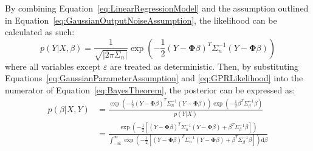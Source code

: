 \documentclass{article}
\begin{document}
By combining Equation~\eqref{eq:LinearRegressionModel} and the assumption outlined in Equation~\eqref{eq:GaussianOutputNoiseAssumption}, the likelihood can be calculated as such:
\begin{equation}
\label{eq:GPRLikelihood}
	p\!\left(Y|X,\beta\right) = \frac{1}{\sqrt{\left|2 \pi \Sigma_n\right|}} \exp\!\left(-\frac{1}{2} \left(Y - \mathbf{\Phi} \beta\right)^T \Sigma_n^{-1} \left(Y - \mathbf{\Phi} \beta\right)\right)
\end{equation}
where all variables except $\varepsilon$ are treated as deterministic. Then, by substituting Equations~\eqref{eq:GaussianParameterAssumption} and \eqref{eq:GPRLikelihood} into the numerator of Equation~\eqref{eq:BayesTheorem}, the posterior can be expressed as:
\begin{equation}
\label{eq:GPRPosteriorProportional}
	\begin{aligned}
	p\!\left(\beta|X,Y\right) &= \frac{\exp\!\left(-\frac{1}{2} \left(Y - \mathbf{\Phi} \beta\right)^T \Sigma_n^{-1} \left(Y - \mathbf{\Phi} \beta\right)\right) \exp\!\left(-\frac{1}{2} \beta^T \Sigma_\beta^{-1} \beta\right)}{p\!\left(Y|X\right)} \\
	&= \frac{\exp\!\left(-\frac{1}{2} \left[\left(Y - \mathbf{\Phi} \beta\right)^T \Sigma_n^{-1} \left(Y - \mathbf{\Phi} \beta\right) + \beta^T \Sigma_\beta^{-1} \beta\right]\right)}{\int_{-\infty}^{\infty} \exp\!\left(-\frac{1}{2} \left[\left(Y - \mathbf{\Phi} \beta\right)^T \Sigma_n^{-1} \left(Y - \mathbf{\Phi} \beta\right) + \beta^T \Sigma_\beta^{-1} \beta\right]\right) \text{d}\beta}
	\end{aligned}
\end{equation}
\end{document}
